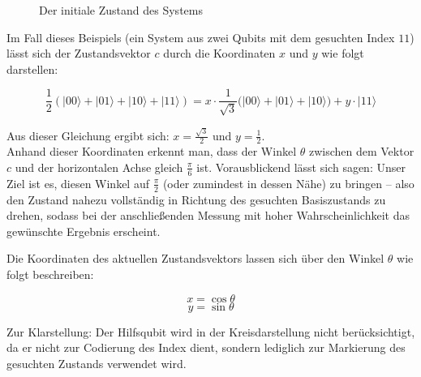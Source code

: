 {\begin{figure}[H]
    \centering
    \caption{Der initiale Zustand des Systems}
    \label{fig:initial-grover-three-qubits}
\end{figure}

Im Fall dieses Beispiels (ein System aus zwei Qubits mit dem gesuchten Index $11$) lässt sich der Zustandsvektor $c$ durch die Koordinaten $x$ und $y$ wie folgt darstellen:

$$
\frac{1}{2}(|00\rangle + |01\rangle + |10\rangle + |11\rangle) = x \cdot \frac{1}{\sqrt{3}}(|00\rangle + |01\rangle + |10\rangle) + y \cdot |11\rangle
$$

\noindent Aus dieser Gleichung ergibt sich: $x = \frac{\sqrt{3}}{2}$ und $y = \frac{1}{2}$.\\

Anhand dieser Koordinaten erkennt man, dass der Winkel $\theta$ zwischen dem Vektor $c$ und der horizontalen Achse gleich $\frac{\pi}{6}$ ist. Vorausblickend lässt sich sagen: Unser Ziel ist es, diesen Winkel auf $\frac{\pi}{2}$ (oder zumindest in dessen Nähe) zu bringen – also den Zustand nahezu vollständig in Richtung des gesuchten Basiszustands zu drehen, sodass bei der anschließenden Messung mit hoher Wahrscheinlichkeit das gewünschte Ergebnis erscheint.

Die Koordinaten des aktuellen Zustandsvektors lassen sich über den Winkel $\theta$ wie folgt beschreiben:

$$
x = \cos{\theta}
$$
$$
y = \sin{\theta}
$$

Zur Klarstellung: Der Hilfsqubit wird in der Kreisdarstellung nicht berücksichtigt, da er nicht zur Codierung des Index dient, sondern lediglich zur Markierung des gesuchten Zustands verwendet wird.

}
